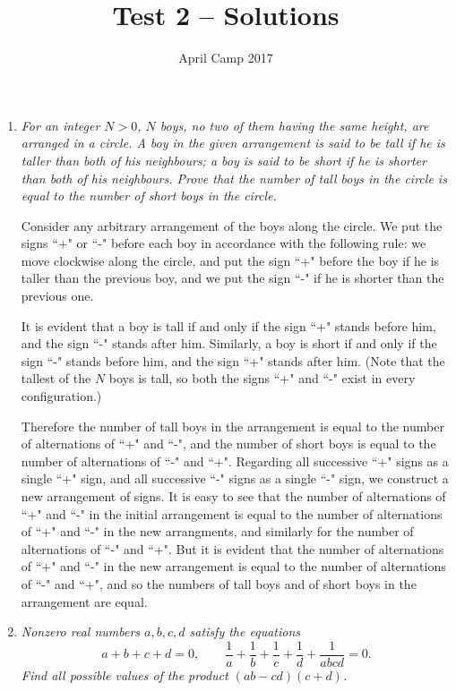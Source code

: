 \documentclass[a4paper,12pt]{article}
\author{April Camp 2017}
\title{Test 2 -- Solutions}
\date{}
\begin{document}
 \maketitle

\begin{enumerate}
	\item 
	\textit{For an integer $N>0$, $N$ boys, no two of them having the same height, are arranged in a circle. A boy in the given arrangement is said to be \emph{tall} if he is taller than both of his neighbours; a boy is said to be \emph{short} if he is shorter than both of his neighbours. Prove that the number of tall boys in the circle is equal to the number of short boys in the circle.}
	
    Consider any arbitrary arrangement of the boys along the circle. We put the
    signs ``+" or ``-" before each boy in accordance with the following rule:
    we move clockwise along the circle, and put the sign ``+" before the boy if
    he is taller than the previous boy, and we put the sign ``-" if he is
    shorter than the previous one.

    It is evident that a boy is tall if and only if the sign ``+" stands before
    him, and the sign ``-" stands after him. Similarly, a boy is short if and
    only if the sign ``-" stands before him, and the sign ``+" stands after
    him. (Note that the tallest of the $N$ boys is tall, so both the signs
    ``+" and ``-" exist in every configuration.)

    Therefore the number of tall boys in the arrangement is equal to the number
    of alternations of ``+" and ``-", and the number of short boys is equal
    to the number of alternations of ``-" and ``+". Regarding all
    successive ``+" signs as a single ``+" sign, and all successive ``-" signs
    as a single ``-" sign, we construct a new arrangement of signs. It is easy
    to see that the number of alternations of ``+" and ``-" in the initial
    arrangement is equal to the number of alternations of ``+" and ``-" in the
    new arrangments, and similarly for the number of alternations of ``-" and
    ``+". But it is evident that the number of alternations of ``+" and ``-" in
    the new arrangement is equal to the number of alternations of ``-" and
    ``+", and so the numbers of tall boys and of short boys in the
    arrangement are equal.
	
		
	\item 
	\textit{Nonzero real numbers $a,b,c,d$ satisfy the equations \[a+b+c+d = 0, \qquad \frac{1}{a}+\frac{1}{b}+\frac{1}{c}+\frac{1}{d}+\frac{1}{abcd} = 0.\]
	Find all possible values of the product $(ab-cd)(c+d)$.}
	

\end{enumerate}
\end{document}
